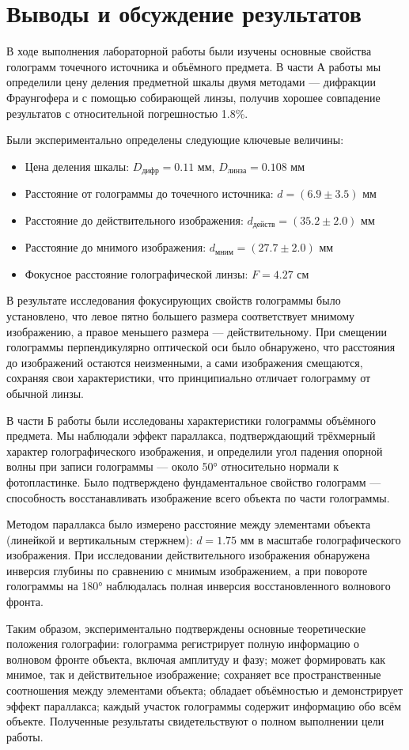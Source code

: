 \section{Выводы и обсуждение результатов}

В ходе выполнения лабораторной работы были изучены основные свойства голограмм точечного источника и объёмного предмета. В части А работы мы определили цену деления предметной шкалы двумя методами — дифракции Фраунгофера и с помощью собирающей линзы, получив хорошее совпадение результатов с относительной погрешностью 1.8\%. 

Были экспериментально определены следующие ключевые величины:
\begin{itemize}
    \item Цена деления шкалы: $D_{\text{дифр}} = 0.11$ мм, $D_{\text{линза}} = 0.108$ мм
    \item Расстояние от голограммы до точечного источника: $d = (6.9 \pm 3.5)$ мм
    \item Расстояние до действительного изображения: $d_{\text{действ}} = (35.2 \pm 2.0)$ мм
    \item Расстояние до мнимого изображения: $d_{\text{мним}} = (27.7 \pm 2.0)$ мм
    \item Фокусное расстояние голографической линзы: $F = 4.27$ см
\end{itemize}

В результате исследования фокусирующих свойств голограммы было установлено, что левое пятно большего размера соответствует мнимому изображению, а правое меньшего размера — действительному. При смещении голограммы перпендикулярно оптической оси было обнаружено, что расстояния до изображений остаются неизменными, а сами изображения смещаются, сохраняя свои характеристики, что принципиально отличает голограмму от обычной линзы.

В части Б работы были исследованы характеристики голограммы объёмного предмета. Мы наблюдали эффект параллакса, подтверждающий трёхмерный характер голографического изображения, и определили угол падения опорной волны при записи голограммы — около 50° относительно нормали к фотопластинке. Было подтверждено фундаментальное свойство голограмм — способность восстанавливать изображение всего объекта по части голограммы.

Методом параллакса было измерено расстояние между элементами объекта (линейкой и вертикальным стержнем): $d = 1.75$ мм в масштабе голографического изображения. При исследовании действительного изображения обнаружена инверсия глубины по сравнению с мнимым изображением, а при повороте голограммы на 180° наблюдалась полная инверсия восстановленного волнового фронта.

Таким образом, экспериментально подтверждены основные теоретические положения голографии: голограмма регистрирует полную информацию о волновом фронте объекта, включая амплитуду и фазу; может формировать как мнимое, так и действительное изображение; сохраняет все пространственные соотношения между элементами объекта; обладает объёмностью и демонстрирует эффект параллакса; каждый участок голограммы содержит информацию обо всём объекте. Полученные результаты свидетельствуют о полном выполнении цели работы.
